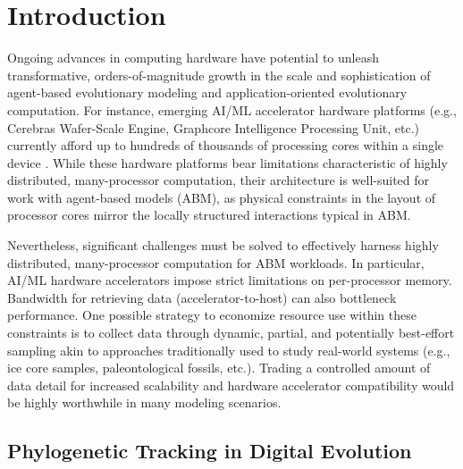 \section{Introduction} \label{sec:introduction}

Ongoing advances in computing hardware have potential to unleash transformative, orders-of-magnitude growth in the scale and sophistication of agent-based evolutionary modeling and application-oriented evolutionary computation.
For instance, emerging AI/ML accelerator hardware platforms (e.g., Cerebras Wafer-Scale Engine, Graphcore Intelligence Processing Unit, etc.) currently afford up to hundreds of thousands of processing cores within a single device \citep{lauterbach2021path,jia2019dissecting}.
While these hardware platforms bear limitations characteristic of highly distributed, many-processor computation, their architecture is well-suited for work with agent-based models (ABM), as physical constraints in the layout of processor cores mirror the locally structured interactions typical in ABM.

Nevertheless, significant challenges must be solved to effectively harness highly distributed, many-processor computation for ABM workloads.
In particular, AI/ML hardware accelerators impose strict limitations on per-processor memory.
Bandwidth for retrieving data (accelerator-to-host) can also bottleneck performance.
One possible strategy to economize resource use within these constraints is to collect data through dynamic, partial, and potentially best-effort sampling akin to approaches traditionally used to study real-world systems (e.g., ice core samples, paleontological fossils, etc.).
Trading a controlled amount of data detail for increased scalability and hardware accelerator compatibility would be highly worthwhile in many modeling scenarios.

\subsection{Phylogenetic Tracking in Digital Evolution}

